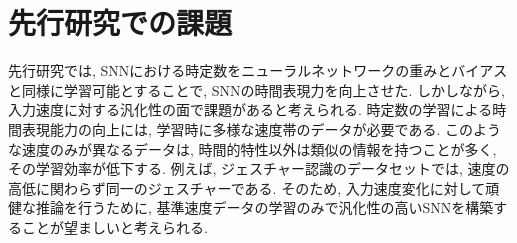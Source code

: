 \section{先行研究での課題}
先行研究では, SNNにおける時定数をニューラルネットワークの重みとバイアスと同様に学習可能とすることで, SNNの時間表現力を向上させた.
しかしながら, 入力速度に対する汎化性の面で課題があると考えられる.
時定数の学習による時間表現能力の向上には, 学習時に多様な速度帯のデータが必要である.
このような速度のみが異なるデータは, 時間的特性以外は類似の情報を持つことが多く, その学習効率が低下する.
例えば, ジェスチャー認識のデータセットでは, 速度の高低に関わらず同一のジェスチャーである.
そのため, 入力速度変化に対して頑健な推論を行うために, 基準速度データの学習のみで汎化性の高いSNNを構築することが望ましいと考えられる.
